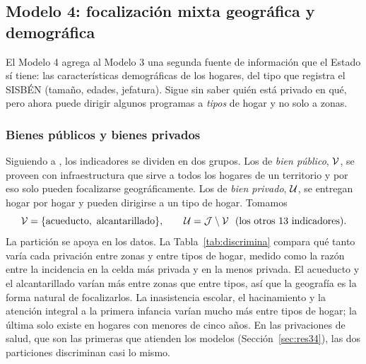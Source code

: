 \subsection{Modelo 4: focalización mixta geográfica y demográfica}\label{sec:m4}

El Modelo 4 agrega al Modelo 3 una segunda fuente de información que el Estado sí
tiene: las características demográficas de los hogares, del tipo que registra el
SISBÉN (tamaño, edades, jefatura). Sigue sin saber quién está privado en qué, pero
ahora puede dirigir algunos programas a \emph{tipos} de hogar y no solo a zonas.

\subsubsection{Bienes públicos y bienes privados}

Siguiendo a \citet{hamie2024}, los indicadores se dividen en dos grupos. Los de
\emph{bien público}, $\mathcal{V}$, se proveen con infraestructura que sirve a todos los
hogares de un territorio y por eso solo pueden focalizarse geográficamente. Los de
\emph{bien privado}, $\mathcal{U}$, se entregan hogar por hogar y pueden dirigirse a un
tipo de hogar. Tomamos
\[
\Vpub=\{\text{acueducto},\ \text{alcantarillado}\},\qquad
\Upriv=\Ind\setminus\Vpub\ \ (\text{los otros 13 indicadores}).
\]
La partición se apoya en los datos. La Tabla~\ref{tab:discrimina} compara qué
tanto varía cada privación entre zonas y entre tipos de hogar, medido como la
razón entre la incidencia en la celda más privada y en la menos privada. El
acueducto y el alcantarillado varían más entre zonas que entre tipos, así que
la geografía es la forma natural de focalizarlos. La inasistencia escolar, el
hacinamiento y la atención integral a la primera infancia varían mucho más entre
tipos de hogar; la última solo existe en hogares con menores de cinco años. En
las privaciones de salud, que son las primeras que atienden los modelos
(Sección~\ref{sec:res34}), las dos particiones discriminan casi lo mismo.

